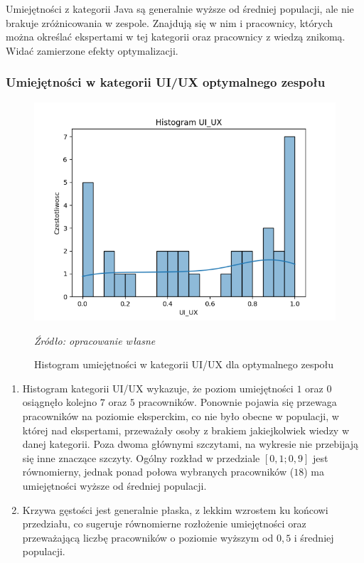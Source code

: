         \par Umiejętności z kategorii Java są generalnie wyższe od średniej populacji, ale nie brakuje zróżnicowania w zespole. Znajdują się w nim i pracownicy, których można określać ekspertami w tej kategorii oraz pracownicy z wiedzą znikomą. Widać zamierzone efekty optymalizacji.
        
        \subsubsection{Umiejętności w kategorii UI/UX optymalnego zespołu}
        \begin{figure}[H]
            \centering
            \includegraphics[width=\linewidth]{chapters/Images/hist_uiux_optimal.png}
            \cprotect\caption{Histogram umiejętności w kategorii UI/UX dla optymalnego zespołu}
            \textit{Źródło: opracowanie własne} 
            \label{fig:hist_uiux_optimal}
        \end{figure}

        \begin{enumerate}
        \item Histogram kategorii UI/UX wykazuje, że poziom umiejętności $1$ oraz $0$ osiągnęło kolejno $7$ oraz $5$ pracowników. Ponownie pojawia się przewaga pracowników na poziomie eksperckim, co nie było obecne w populacji, w której nad ekspertami, przeważały osoby z brakiem jakiejkolwiek wiedzy w danej kategorii. Poza dwoma głównymi szczytami, na wykresie nie przebijają się inne znaczące szczyty. Ogólny rozkład w przedziale $[0,1; 0,9]$ jest równomierny, jednak ponad połowa wybranych pracowników ($18$) ma umiejętności wyższe od średniej populacji.
        \item Krzywa gęstości jest generalnie płaska, z lekkim wzrostem ku końcowi przedziału, co sugeruje równomierne rozłożenie umiejętności oraz przeważającą liczbę pracowników o poziomie wyższym od $0,5$ i średniej populacji.
        \end{enumerate}

